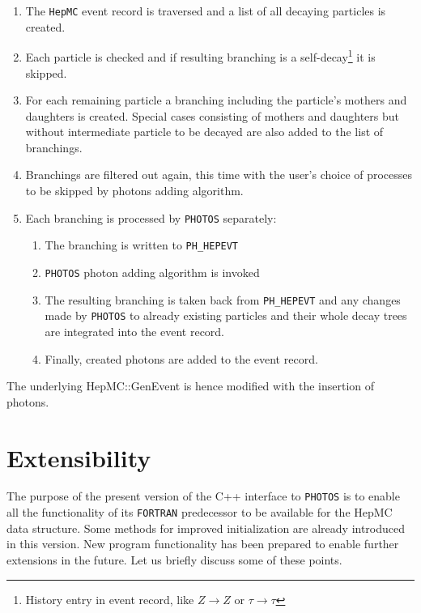 \documentclass[]{Photos_interface_design}
\begin{document}
\begin{enumerate}
\item The {\tt HepMC} event record is traversed and a list of all decaying
      particles is created.
\item Each particle is checked and if resulting branching is a self-decay\footnote{History entry in event record, like
      $Z\to Z$ or $\tau \to \tau$} it is skipped.
\item For each remaining particle a branching  including the particle's mothers and daughters
      is created. Special cases consisting of mothers and daughters but without  intermediate particle 
to be decayed are also added to the 
	  list of branchings.
\item Branchings are filtered out again, this time with  the user's choice of processes
      to be skipped by photons adding algorithm.
\item Each branching  is processed by {\tt PHOTOS} separately:

	\begin{enumerate}
  
	\item The branching is written to {\tt PH\_HEPEVT}
	\item {\tt PHOTOS} photon adding algorithm is invoked 
 	\item The resulting branching is taken back from {\tt PH\_HEPEVT} and any changes made by {\tt PHOTOS}
	      to already existing particles and their whole decay trees are integrated into the event record.
	\item Finally, created photons are added to the event record.
	\end{enumerate}

\end{enumerate}

The underlying HepMC::GenEvent is hence modified with the  insertion of photons.

\section{Extensibility}
\label{sec:extensibility}
 The purpose of the present version of the C++ interface to {\tt PHOTOS} is to enable 
all the functionality of its {\tt FORTRAN} predecessor to be available for the HepMC data
structure. Some methods for improved initialization are already introduced in this version. New program 
functionality has been prepared to enable further extensions in the future. 
Let us briefly discuss some of these points.
\end{document}

